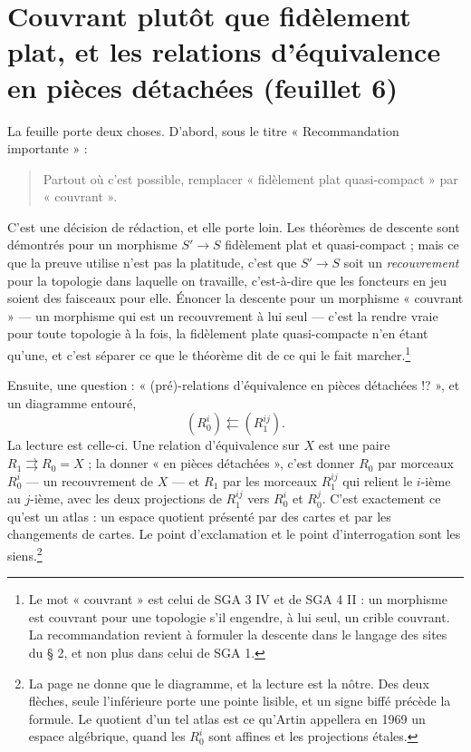 \documentclass[11pt,a4paper]{article}
\begin{document}
\section*{Couvrant plutôt que fidèlement plat, et les relations d'équivalence en pièces détachées (feuillet 6)}

La feuille porte deux choses. D'abord, sous le titre « Recommandation
importante » :

\begin{quote}
Partout où c'est possible, remplacer « fidèlement plat quasi-compact » par
« couvrant ».
\end{quote}

C'est une décision de rédaction, et elle porte loin. Les théorèmes de
descente sont démontrés pour un morphisme $S' \to S$ fidèlement plat et
quasi-compact ; mais ce que la preuve utilise n'est pas la platitude, c'est
que $S' \to S$ soit un \emph{recouvrement} pour la topologie dans laquelle on
travaille, c'est-à-dire que les foncteurs en jeu soient des faisceaux pour
elle. Énoncer la descente pour un morphisme « couvrant » — un morphisme qui
est un recouvrement à lui seul — c'est la rendre vraie pour toute topologie
à la fois, la fidèlement plate quasi-compacte n'en étant qu'une, et c'est
séparer ce que le théorème dit de ce qui le fait marcher.\footnote{Le mot
« couvrant » est celui de SGA 3 IV et de SGA 4 II : un morphisme est couvrant
pour une topologie s'il engendre, à lui seul, un crible couvrant. La
recommandation revient à formuler la descente dans le langage des sites du
§ 2, et non plus dans celui de SGA 1.}

Ensuite, une question : « (pré)-relations d'équivalence en pièces
détachées !? », et un diagramme entouré,
\[
  (R_0^{i}) \leftleftarrows (R_1^{ij}) .
\]
La lecture est celle-ci. Une relation d'équivalence sur $X$ est une paire
$R_1 \rightrightarrows R_0 = X$ ; la donner « en pièces détachées », c'est
donner $R_0$ par morceaux $R_0^{i}$ — un recouvrement de $X$ — et $R_1$ par
les morceaux $R_1^{ij}$ qui relient le $i$-ième au $j$-ième, avec les deux
projections de $R_1^{ij}$ vers $R_0^{i}$ et $R_0^{j}$. C'est exactement ce
qu'est un atlas : un espace quotient présenté par des cartes et par les
changements de cartes. Le point d'exclamation et le point d'interrogation
sont les siens.\footnote{La page ne donne que le diagramme, et la lecture est
la nôtre. Des deux flèches, seule l'inférieure porte une pointe lisible, et
un signe biffé précède la formule. Le quotient d'un tel atlas est ce qu'Artin
appellera en 1969 un espace algébrique, quand les $R_0^{i}$ sont affines et
les projections étales.}
\end{document}
